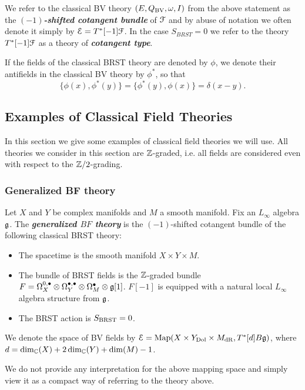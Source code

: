 \documentclass[10pt, oneside]{article}
\newcommand{\defterm}[1]{\textbf{\emph{#1}}}
\begin{document}
We refer to the classical BV theory $(E, Q_{\mathrm{BV}}, \omega, I)$ from the above statement as the \defterm{$(-1)$-shifted cotangent bundle} of $\mathcal F$ and by abuse of notation we often denote it simply by $\mathcal E = T^*[-1] \mathcal F$. In the case $S_{BRST} = 0$ we refer to the theory $T^*[-1] \mathcal F$ as a theory of \defterm{cotangent type}.

If the fields of the classical BRST theory are denoted by $\phi$, we denote their antifields in the classical BV theory by $\phi^*$, so that
\[\{\phi(x), \phi^*(y)\} = \{\phi^*(y), \phi(x)\} = \delta(x-y).\]

\subsection{Examples of Classical Field Theories}

In this section we give some examples of classical field theories we will use. All theories we consider in this section are $\mathbb Z$-graded, i.e. all fields are considered even with respect to the $\mathbb Z/2$-grading.

\subsubsection{Generalized BF theory} \label{gen_BF_section}

\begin{definition}
Let $X$ and $Y$ be complex manifolds and $M$ a smooth manifold. Fix an $L_\infty$ algebra $\mathfrak g$. The \defterm{generalized $BF$ theory} is the $(-1)$-shifted cotangent bundle of the following classical BRST theory:
\begin{itemize}
\item The spacetime is the smooth manifold $X\times Y\times M$.

\item The bundle of BRST fields is the $\mathbb Z$-graded bundle $F = \Omega^{0,\bullet}_X \otimes \Omega^{\bullet,\bullet}_Y \otimes \Omega^\bullet_M \otimes \mathfrak g[1]$. $F[-1]$ is equipped with a natural local $L_\infty$ algebra structure from $\mathfrak g$.

\item The BRST action is $S_{\mathrm{BRST}} = 0$.
\end{itemize}
We denote the space of BV fields by $\mathcal E = \operatorname{Map}(X\times Y_{\mathrm{Dol}}\times M_{\mathrm{dR}}, T^*[d] B\mathfrak g)$, where $d = \dim_\mathbb C(X) + 2\dim_\mathbb C(Y) + \dim(M) - 1$.
\label{def:generalizedBF}
\end{definition}

\begin{remark}
We do not provide any interpretation for the above mapping space and simply view it as a compact way of referring to the theory above.
\end{remark}
\end{document}
